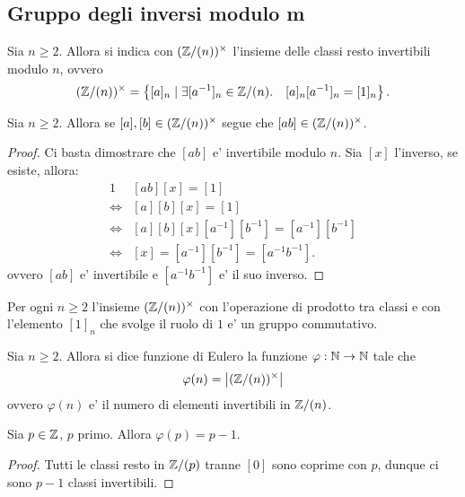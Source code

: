 \subsection{Gruppo degli inversi modulo m}

\begin{definition}
    Sia $n \geq 2$. Allora si indica con $(\mathbb{Z}/(n))^{\times}$ l'insieme delle classi resto invertibili modulo $n$, ovvero \begin{equation}
        (\mathbb{Z}/(n))^{\times} = \left\{[a]_n \mid \exists [a^{-1}]_n \in \mathbb{Z}/(n). \quad [a]_n[a^{-1}]_n = [1]_n\right\}.
    \end{equation} 
\end{definition}

\begin{proposition}\label{prodotto_invertibili_invertibile}
    Sia $n \geq 2$. Allora se $[a], [b] \in (\mathbb{Z}/(n))^{\times}$ segue che $[ab] \in (\mathbb{Z}/(n))^{\times}$.
\end{proposition}
\begin{proof}
    Ci basta dimostrare che $[ab]$ e' invertibile modulo $n$. Sia $[x]$ l'inverso, se esiste, allora:
    \begin{alignat*}{1}
        &[ab][x] = [1] \\
        \iff &[a][b][x] = [1] \\
        \iff &[a][b][x][a^{-1}][b^{-1}] = [a^{-1}][b^{-1}] \\
        \iff &[x] = [a^{-1}][b^{-1}] = [a^{-1}b^{-1}].
    \end{alignat*}
    ovvero $[ab]$ e' invertibile e $[a^{-1}b^{-1}]$ e' il suo inverso.
\end{proof}

\begin{proposition}\label{Z(n)*_anello}
    Per ogni $n \geq 2$ l'insieme $(\mathbb{Z}/(n))^{\times}$ con l'operazione di prodotto tra classi e con l'elemento $[1]_n$ che svolge il ruolo di $1$ e' un gruppo commutativo.
\end{proposition}

\begin{definition}
    Sia $n \geq 2$. Allora si dice funzione di Eulero la funzione $\varphi : \mathbb{N} \to \mathbb{N}$ tale che \begin{equation}
        \varphi(n) = \left|(\mathbb{Z}/(n))^{\times}\right|
    \end{equation}
    ovvero $\varphi(n)$ e' il numero di elementi invertibili in $\mathbb{Z}/(n)$.
\end{definition}

\begin{proposition}
    Sia $p \in \mathbb{Z}$, $p$ primo. Allora $\varphi(p) = p - 1$. 
\end{proposition}
\begin{proof}
    Tutti le classi resto in $\mathbb{Z}/(p)$ tranne $[0]$ sono coprime con $p$, dunque ci sono $p-1$ classi invertibili.
\end{proof}

